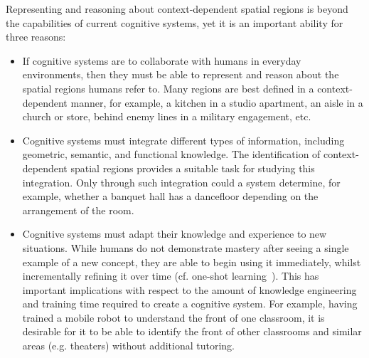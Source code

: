 \documentclass[letterpaper]{article}
\begin{document}
Representing and reasoning about context-dependent spatial regions is beyond the capabilities of current cognitive systems, yet it is an important ability for three reasons:
\begin{itemize}

\item{If cognitive systems are to collaborate with humans in everyday environments, then they must be able to represent and reason about the spatial regions humans refer to. Many regions are best defined in a context-dependent manner, for example, a kitchen in a studio apartment, an aisle in a church or store, behind enemy lines in a military engagement, etc.}


\item{Cognitive systems must integrate different types of information, including geometric, semantic, and functional knowledge. The identification of context-dependent spatial regions provides a suitable task for studying this integration. Only through such integration could a system determine, for example, whether a banquet hall has a dancefloor depending on the arrangement of the room.}

\item{Cognitive systems must adapt their knowledge and experience to new situations. While humans do not demonstrate mastery after seeing a single example of a new concept, they are able to begin using it immediately, whilst incrementally refining it over time (cf. one-shot learning~\cite{Fei-Fei/etal:2006}). This has important implications with respect to the amount of knowledge engineering and training time required to create a cognitive system. For example, having trained a mobile robot to understand the front of one classroom, it is desirable for it to be able to identify the front of other classrooms and similar areas (e.g. theaters) without additional tutoring.}
\end{itemize}
\end{document}
